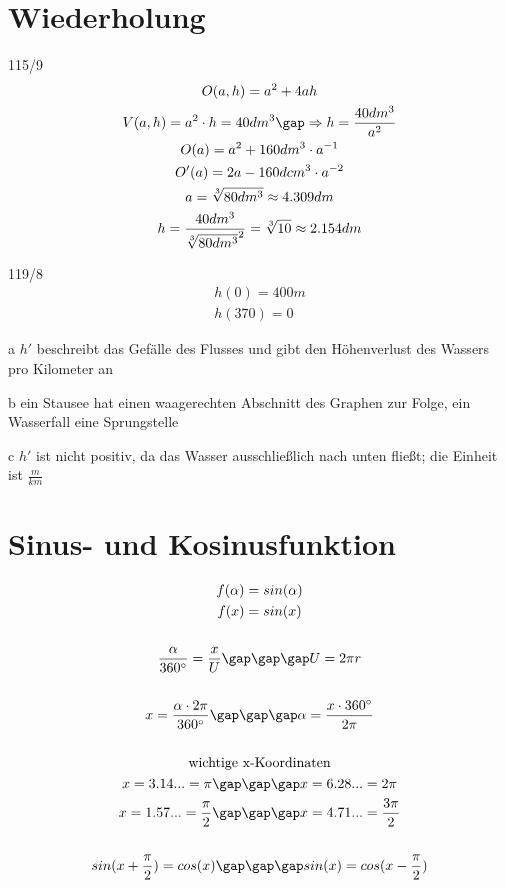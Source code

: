 \section{Wiederholung}
\begin{exercise}{115/9}
  \begin{gather*}
    O(a, h) = a^2 + 4ah \\
    V(a, h) = a^2 \cdot h = 40dm^3 \gap\Rightarrow h = \frac{40dm^3}{a^2} \\
    O(a) = a^2 + 160dm^3 \cdot a^{-1} \\
    O'(a) = 2a - 160dcm^3 \cdot a^{-2} \\
    a = \sqrt[3]{80dm^3} \approx 4.309dm \\
    h = \frac{40dm^3}{\sqrt[3]{80dm^3}^2} = \sqrt[3]{10} \approx 2.154dm
  \end{gather*}
\end{exercise}
\begin{exercise}{119/8}
  \begin{gather*}
    h(0) = 400m \\
    h(370) = 0
  \end{gather*}
  \item [a]
  $h'$ beschreibt das Gefälle des Flusses und gibt den Höhenverlust des Wassers pro Kilometer an
  \item [b]
  ein Stausee hat einen waagerechten Abschnitt des Graphen zur Folge, ein Wasserfall eine Sprungstelle
  \item [c]
  $h'$ ist nicht positiv, da das Wasser ausschließlich nach unten fließt; die Einheit ist $\frac{m}{km}$
\end{exercise}

\section{Sinus- und Kosinusfunktion}
\begin{gather*}
  f(\alpha) = sin(\alpha) \\
  f(x) = sin(x) \\\\
  \frac{\alpha}{360^\circ} = \frac{x}{U} \gap\gap\gap U = 2\pi r \\\\
  x = \frac{\alpha \cdot 2\pi}{360^\circ} \gap\gap\gap \alpha = \frac{x \cdot 360^\circ}{2\pi} \\\\
  \text{wichtige x-Koordinaten} \\
  x = 3.14... = \pi \gap\gap\gap x = 6.28... = 2\pi \\
  x = 1.57... = \frac{\pi}{2} \gap\gap\gap x = 4.71... = \frac{3\pi}{2} \\\\
  sin(x + \frac{\pi}{2}) = cos(x) \gap\gap\gap sin(x) = cos(x - \frac{\pi}{2}) \\\\
\end{gather*}
